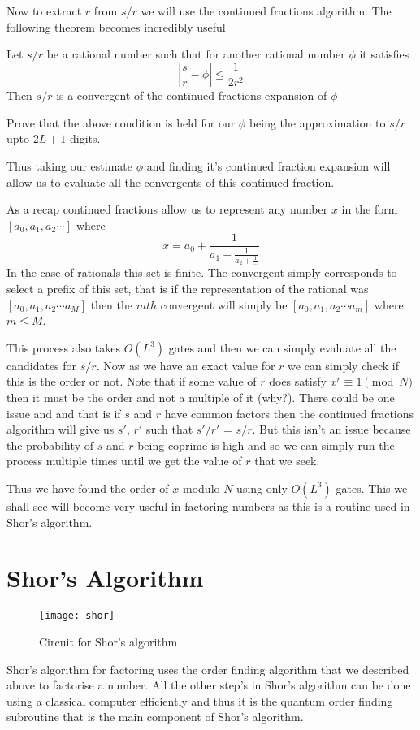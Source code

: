 Now to extract $r$ from $s/r$ we will use the continued fractions algorithm. The following theorem becomes incredibly useful

\begin{theorem}
Let $s/r$ be a rational number such that for another rational number $\phi$ it satisfies 
$$ |\frac{s}{r} - \phi| \leq \frac{1}{2r^2}$$
Then $s/r$ is a convergent of the continued fractions expansion of $\phi$
\end{theorem}

\begin{exercise}
Prove that the above condition is held for our $\phi$ being the approximation to $s/r$ upto $2L + 1$ digits.
\end{exercise}

Thus taking our estimate $\phi$ and finding it's continued fraction expansion will allow us to evaluate all the convergents of this continued fraction.

As a recap continued fractions allow us to represent any number $x$ in the form $\left[ a_0, a_1, a_2 \cdots \right]$ where 
$$ x = a_0 + \frac{1}{a_1 + \frac{1}{a_2 + \frac{1}{\cdots}}} $$
In the case of rationals this set is finite. The convergent simply corresponds to select a prefix of this set, that is if the representation of the rational was $\left[ a_0, a_1, a_2 \cdots a_M \right]$  then the $mth$ convergent will simply be $\left[ a_0, a_1, a_2 \cdots a_m \right]$ where $m \leq M$.

This process also takes $O(L^3)$ gates and then we can simply evaluate all the candidates for $s/r$. Now as we have an exact value for $r$ we can simply check if this is the order or not. Note that if some value of $r$ does satisfy $x^r \equiv 1 \pmod N$ then it must be the order and not a multiple of it (why?). There could be one issue and and that is if $s$ and $r$ have common factors then the continued fractions algorithm will give us $s'$, $r'$ such that $s'/r'$ = $s/r$. But this isn't an issue because the probability of $s$ and $r$ being coprime is high and so we can simply run the process multiple times until we get the value of $r$ that we seek.

Thus we have found the order of $x$ modulo $N$ using only $O(L^3)$ gates. This we shall see will become very useful in factoring numbers as this is a routine used in Shor's algorithm.

\section{Shor's Algorithm}
\begin{figure}[htp]
    \caption{Circuit for Shor's algorithm}
    \centering
    \texttt{[image: shor]}
\end{figure}
Shor's algorithm for factoring uses the order finding algorithm that we described above to factorise a number. All the other step's in Shor's algorithm can be done using a classical computer efficiently and thus it is the quantum order finding subroutine that is the main component of Shor's algorithm.


